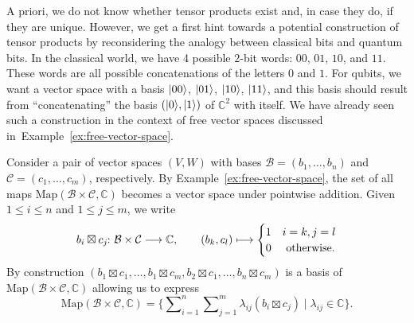 \documentclass[a4paper, oneside, 12pt]{amsart}
\begin{document}
A priori, we do not know whether tensor products exist and, in case they do, if they are unique.
However, we get a first hint towards a potential construction of tensor products by reconsidering the analogy between classical bits and quantum bits.
In the classical world, we have 4 possible \(2\)-bit words: \(00\), \(01\), \(10\), and  \(11\).
These words are all possible concatenations of the letters \(0\) and \(1\).
For qubits, we want a vector space with a basis \(\lvert00\rangle\), \(\lvert01\rangle\), \(\lvert10\rangle\), \(\lvert11\rangle\), and this basis should result from ``concatenating'' the basis \((\lvert0\rangle, \lvert1\rangle)\) of \( \mathbb{C}^{2}\) with itself.
We have already seen such a construction  in the context of free vector spaces discussed in~Example~\ref{ex:free-vector-space}.

\begin{remark}\label{rmk:realisation-of-tensor-products}
  Consider a  pair of vector spaces \((V,W)\) with bases \(\mathcal{B}= (b_{1}, \dots , b_{n})\) and \(\mathcal{C}= (c_{1}, \dots , c_{m})\), respectively.
  By Example~\ref{ex:free-vector-space}, the set of all maps \(\mathrm{Map}(\mathcal{B}\times \mathcal{C}, \mathbb{C})\) becomes a vector space under pointwise addition.
  Given \(1\leq i \leq n\) and \(1 \leq j \leq m\), we write
  \begin{equation*}
    b_{i} \boxtimes c_{j} \from \mathcal{B} \times \mathcal{C} \to \mathbb{C}, \qquad (b_{k}, c_{l}) \mapsto
    \begin{cases}
      1 & i=k, j= l \\
      0 & \text{ otherwise.}
    \end{cases}
  \end{equation*}
  By construction \((b_{1}\boxtimes c_{1}, \dots , b_{1}\boxtimes c_{m}, b_{2} \boxtimes c_{1}, \dots , b_{n} \boxtimes c_{m})\) is a basis of \(\mathrm{Map}(\mathcal{B}\times \mathcal{C}, \mathbb{C})\) allowing us to express
  \begin{equation*}
    \mathrm{Map}(\mathcal{B}\times \mathcal{C}, \mathbb{C}) =  \big\{ \sum\nolimits_{i=1}^{n}\sum\nolimits_{j=1}^{m}\lambda_{ij}(b_{i}\boxtimes c_{j})\mid \lambda_{ij} \in \mathbb{C}\big\}.
  \end{equation*}
\end{remark}
\end{document}
